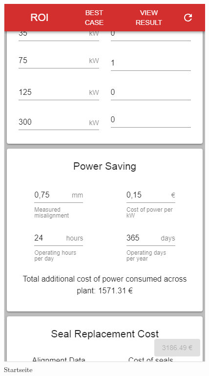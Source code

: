\documentclass{article}
\begin{document}
		
			\begin{figure}
				\includegraphics[scale=0.38]{Bilder/16.png}
				\centering
				\vspace{0 cm}
				\caption{Startseite}
				\label{fig22}	
				

\end{figure}
\end{document}

